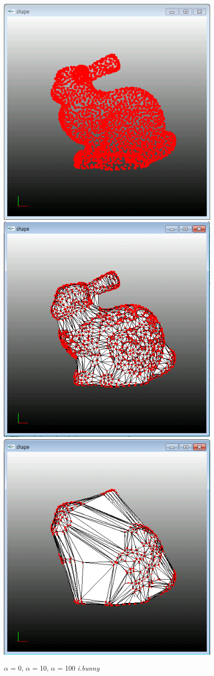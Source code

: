 \documentclass[11pt]{article}
\begin{document}
\begin{figure}[ht]
\includegraphics[width=.5\textwidth]{FIGS/alpha0-ibunny}
\hspace{1cm}
\includegraphics[width=.5\textwidth]{FIGS/alpha10-ibunny}
\vspace{1cm}
\includegraphics[width=.5\textwidth]{FIGS/alpha100-ibunny}
\caption{$\alpha$ = 0, $\alpha$ = 10, $\alpha$ = 100 \textit{i.bunny}}
\end{figure}
\end{document}
